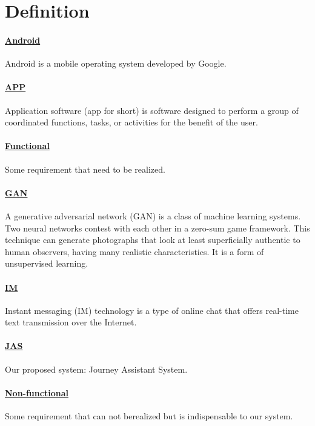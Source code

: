\documentclass[10pt]{article}
\begin{document}
\section{Definition}
\paragraph{\underline{Android}} Android is a mobile operating system developed by Google.

\paragraph{\underline{APP}} Application software (app for short) is software designed to perform a group of coordinated functions, tasks, or activities for the benefit of the user. 

\paragraph{\underline{Functional}} Some requirement that need to be realized.

\paragraph{\underline{GAN}} A generative adversarial network (GAN) is a class of machine learning systems. Two neural networks contest with each other in a zero-sum game framework. This technique can generate photographs that look at least superficially authentic to human observers, having many realistic characteristics. It is a form of unsupervised learning.

\paragraph{\underline{IM}} Instant messaging (IM) technology is a type of online chat that offers real-time text transmission over the Internet.

\paragraph{\underline{JAS}}  Our proposed system: Journey Assistant System.

\paragraph{\underline{Non-functional}} Some requirement that can not berealized but is indispensable to our system.
\end{document}
